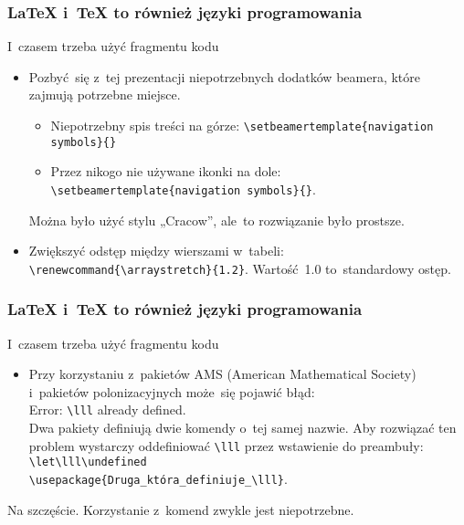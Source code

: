 \documentclass[10pt,t]{beamer}
\begin{document}
\begin{frame}[fragile]
  \frametitle{\LaTeX{} i~\TeX{} to również języki programowania}


  I~czasem trzeba użyć fragmentu kodu
  \begin{itemize}
    \RaggedRight

  \item Pozbyć~się z~tej prezentacji niepotrzebnych dodatków
    beamera, które zajmują potrzebne miejsce.
    \begin{itemize}
      \RaggedRight

    \item[1)] Niepotrzebny spis treści na górze:
      \verb+\setbeamertemplate{navigation symbols}{}+

    \item[2)] Przez nikogo nie używane ikonki na dole:
      \verb+\setbeamertemplate{navigation symbols}{}+.

    \end{itemize}

    Można było użyć stylu „Cracow”, ale~to rozwiązanie było
    prostsze.

  \item Zwiększyć odstęp między wierszami w~tabeli:
    \verb+\renewcommand{\arraystretch}{1.2}+. Wartość~1.0
    to~standardowy ostęp.

  \end{itemize}

\end{frame}





\begin{frame}[fragile]
  \frametitle{\LaTeX{} i~\TeX{} to również języki programowania}


  I~czasem trzeba użyć fragmentu kodu
  \begin{itemize}
    \RaggedRight

  \item Przy korzystaniu z~pakietów AMS (American Mathematical Society)
    i~pakietów polonizacyjnych może~się pojawić błąd: \\
    {\color{red} Error}: \verb+\lll+ already defined. \\
    Dwa pakiety definiują dwie komendy o~tej samej nazwie. Aby rozwiązać
    ten problem wystarczy oddefiniować \verb+\lll+ przez wstawienie
    do preambuły: \\
    \vspace{3pt}
    \verb+\let\lll\undefined+ \\
    \verb+\usepackage{Druga_która_definiuje_\lll}+.

  \end{itemize}



  Na szczęście. Korzystanie z~komend zwykle jest niepotrzebne.

\end{frame}
\end{document}
